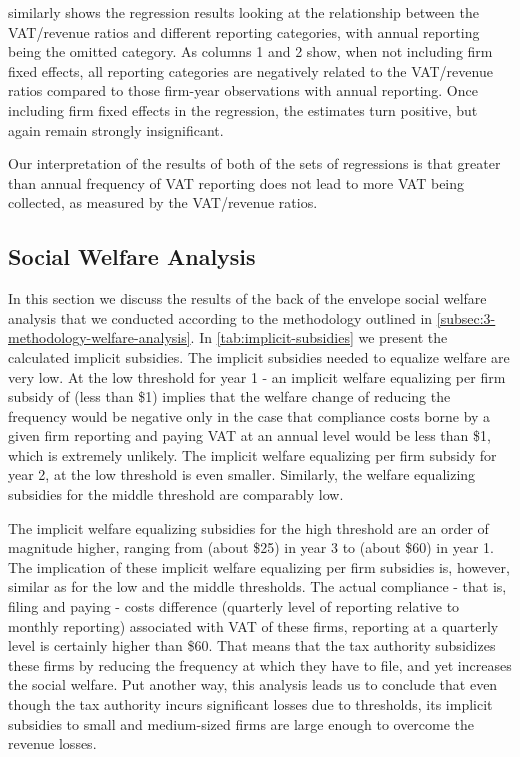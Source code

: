  similarly shows the regression results looking at the relationship between the VAT/revenue ratios and different reporting categories, with annual reporting being the omitted category. As columns 1 and 2 show, when not including firm fixed effects, all reporting categories are negatively related to the VAT/revenue ratios compared to those firm-year observations with annual reporting. Once including firm fixed effects in the regression, the estimates turn positive, but again remain strongly insignificant.

Our interpretation of the results of both of the sets of regressions is that greater than annual frequency of VAT reporting does not lead to more VAT being collected, as measured by the VAT/revenue ratios.

\subsection{Social Welfare Analysis}
\label{subsec:3-results-social-welfare}
In this section we discuss the results of the back of the envelope social welfare analysis that we conducted according to the methodology outlined in \cref{subsec:3-methodology-welfare-analysis}. In \cref{tab:implicit-subsidies} we present the calculated implicit subsidies. The implicit subsidies needed to equalize welfare are very low. At the low threshold for year 1 - an implicit welfare equalizing per firm subsidy of  (less than \$1) implies that the welfare change of reducing the frequency would be negative only in the case that compliance costs borne by a given firm reporting and paying VAT at an annual level would be less than \$1, which is extremely unlikely. The implicit welfare equalizing per firm subsidy for year 2, at the low threshold is even smaller. Similarly, the welfare equalizing subsidies for the middle threshold are comparably low. 

The implicit welfare equalizing subsidies for the high threshold are an order of magnitude higher, ranging from  (about \$25) in year 3 to  (about \$60) in year 1. The implication of these implicit welfare equalizing per firm subsidies is, however, similar as for the low and the middle thresholds. The actual compliance - that is, filing and paying - costs difference (quarterly level of reporting relative to monthly reporting) associated with VAT of these firms, reporting at a quarterly level is certainly higher than \$60. That means that the tax authority subsidizes these firms by reducing the frequency at which they have to file, and yet increases the social welfare. Put another way, this analysis leads us to conclude that even though the tax authority incurs significant losses due to thresholds, its implicit subsidies to small and medium-sized firms are large enough to overcome the revenue losses.
 
